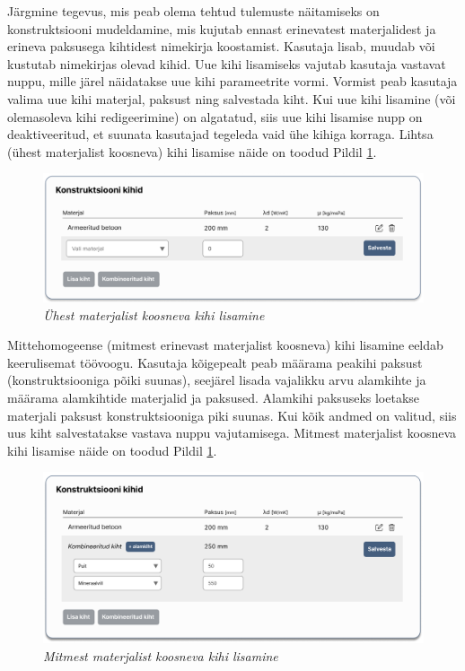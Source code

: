 Järgmine tegevus, mis peab olema tehtud tulemuste näitamiseks on konstruktsiooni mudeldamine, mis
kujutab ennast erinevatest materjalidest ja erineva paksusega kihtidest nimekirja koostamist.
Kasutaja lisab, muudab või kustutab nimekirjas olevad kihid. Uue kihi lisamiseks vajutab kasutaja
vastavat nuppu, mille järel näidatakse uue kihi parameetrite vormi. Vormist peab kasutaja
valima uue kihi materjal, paksust ning salvestada kiht. Kui uue kihi lisamine (või
olemasoleva kihi redigeerimine) on algatatud, siis uue kihi lisamise nupp on deaktiveeritud, et
suunata kasutajad tegeleda vaid ühe kihiga korraga. Lihtsa (ühest materjalist koosneva) kihi lisamise näide
on toodud Pildil \ref{fig:design_simple_layer}.
\begin{figure}[ht]
    \centering
    \includegraphics[width=1\textwidth]{figures/analysis/desing_calc_simple_layer.png}
    \caption[Ühest materjalist koosneva kihi lisamine]{\textit{Ühest materjalist koosneva kihi lisamine}}
    \label{fig:design_simple_layer}
\end{figure}

Mittehomogeense (mitmest erinevast materjalist koosneva) kihi lisamine eeldab keerulisemat töövoogu.
Kasutaja kõigepealt peab määrama peakihi paksust (konstruktsiooniga põiki suunas), seejärel lisada 
vajalikku arvu alamkihte ja määrama alamkihtide materjalid ja paksused. Alamkihi paksuseks loetakse 
materjali paksust konstruktsiooniga piki suunas. Kui kõik andmed on valitud, siis uus kiht salvestatakse
vastava nuppu vajutamisega. Mitmest materjalist koosneva kihi lisamise näide on toodud Pildil \ref{fig:design_simple_layer}.
\begin{figure}[ht]
    \centering
    \includegraphics[width=1\textwidth]{figures/analysis/desing_calc_multi_layer.png}
    \caption[Mitmest materjalist koosneva kihi lisamine]{\textit{Mitmest materjalist koosneva kihi lisamine}}
    \label{fig:design_multy_layer}
\end{figure}

